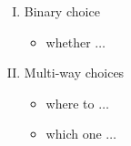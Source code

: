 \begin{frame}
  \centerline{}

  \vspace{0.50cm}
  \begin{columns}
    \pause
      \begin{enumerate}[(I)]
	\setlength{\itemsep}{8pt}
	\item Binary choice
	  \begin{itemize}
	    \item whether $\dots$
	  \end{itemize}
	\item Multi-way choices
	  \begin{itemize}
	    \setlength{\itemsep}{4pt}
	    \item where to $\dots$ 
	    \item which one $\dots$
	  \end{itemize}
      \end{enumerate}
  \end{columns}
\end{frame}
